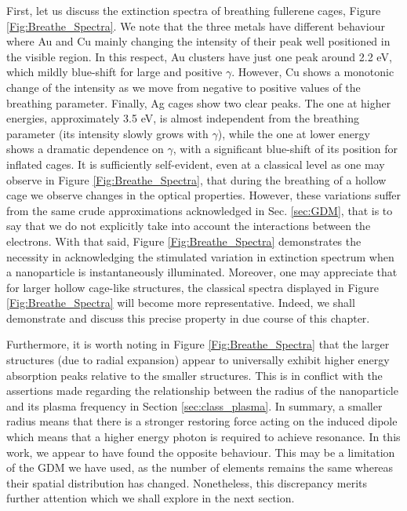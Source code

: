 First, let us discuss the extinction spectra of breathing fullerene cages, Figure \ref{Fig:Breathe_Spectra}. We note that the three metals have different behaviour where Au and Cu mainly changing the intensity of their peak well positioned in the visible region. In this respect, Au clusters have just one peak around 2.2 eV, which mildly blue-shift for large and positive $\gamma$. However, Cu shows a monotonic change of the intensity as we move from negative to positive values of the breathing parameter. Finally, Ag cages show two clear peaks. The one at higher energies, approximately 3.5 eV, is almost independent from the breathing parameter (its intensity slowly grows with $\gamma$), while the one at lower energy shows a dramatic dependence on $\gamma$, with a significant blue-shift of its position for inflated cages. It is sufficiently self-evident, even at a classical level as one may observe in Figure \ref{Fig:Breathe_Spectra}, that during the breathing of a hollow cage we observe changes in the optical properties. However, these variations suffer from the same crude approximations acknowledged in Sec. \ref{sec:GDM}, that is to say that we do not explicitly take into account the interactions between the electrons. With that said, Figure \ref{Fig:Breathe_Spectra} demonstrates the necessity in acknowledging the stimulated variation in extinction spectrum when a nanoparticle is instantaneously illuminated. Moreover, one may appreciate that for larger hollow cage-like structures, the classical spectra displayed in Figure \ref{Fig:Breathe_Spectra} will become more representative. Indeed, we shall demonstrate and discuss this precise property in due course of this chapter.

Furthermore, it is worth noting in Figure \ref{Fig:Breathe_Spectra} that the larger structures (due to radial expansion) appear to universally exhibit higher energy absorption peaks relative to the smaller structures. This is in conflict with the assertions made regarding the relationship between the radius of the nanoparticle and its plasma frequency in Section \ref{sec:class_plasma}. In summary, a smaller radius means that there is a stronger restoring force acting on the induced dipole which means that a higher energy photon is required to achieve resonance. In this work, we appear to have found the opposite behaviour. This may be a limitation of the GDM we have used, as the number of elements remains the same whereas their spatial distribution has changed. Nonetheless, this discrepancy merits further attention which we shall explore in the next section.

